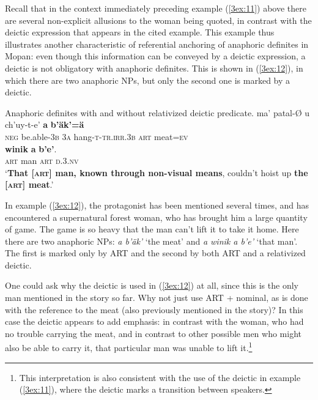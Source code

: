 \documentclass[output=paper]{langsci/langscibook}
\begin{document}
\label{3sec:3121}

\largerpage[-1]
Recall that in the context immediately preceding example (\ref{3ex:11}) above there are several non-explicit allusions to the woman being quoted, in contrast with the deictic expression that appears in the cited example. This example thus illustrates another characteristic of referential anchoring of anaphoric definites in Mopan: even though this information can be conveyed by a deictic expression, a deictic is not obligatory with anaphoric definites. This is shown in (\ref{3ex:12}), in which there are two anaphoric NPs, but only the second one is marked by a deictic.

\begin{exe}
\ex\label{3ex:12}
Anaphoric definites with and without relativized deictic predicate. 
\exi{}
\gll	ma'			patal-{\O}		u		ch'uy-t-e'			{\textbf{a}}	{\textbf{b'\"ak'=\"a}} \\
	{\textsc{neg}}	be.able-{\textsc{3b}}	{\textsc{3a}}	hang-{\textsc{t-tr.irr.3b}}	{\textsc{art}}	meat{\textsc{=ev}} \\
\glt
\exi{} 
	{\textbf{winik}}		{\textbf{a}}	{\textbf{b'e'}}. \\
	{\textsc{art}}	man			{\textsc{art}}	{\textsc{d.3.nv}} \\
\glt	`{\textbf{That [{\textsc{art}}] man, known through non-visual means}}, couldn't hoist up {\textbf{the [{\textsc{art}}] meat}}.'
\end{exe}

In example (\ref{3ex:12}), the protagonist has been mentioned several times, and has encountered a supernatural forest woman, who has brought him a large quantity of game.  The game is so heavy that the man can't lift it to take it home.  Here there are two anaphoric NPs:  {\emph{a b'\"ak'}} `the meat' and {\emph{a winik a b'e'}} `that man'.  The first is marked only by ART and the second by both ART and a relativized deictic.

One could ask why the deictic is used in (\ref{3ex:12}) at all, since this is the only man mentioned in the story so far.  Why not just use ART + nominal, as is done with the reference to the meat (also previously mentioned in the story)?  In this case the deictic appears to add emphasis:  in contrast with the woman, who had no trouble carrying the meat, and in contrast to other possible men who might also be able to carry it, that particular man was unable to lift it.\footnote{This interpretation is also consistent with the use of the deictic in example (\ref{3ex:11}), where the deictic marks a transition between speakers.} 
\end{document}
